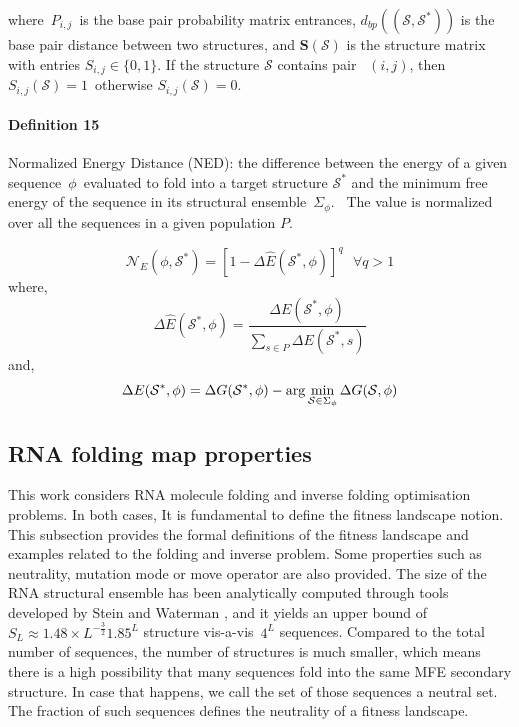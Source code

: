 where~\(P_{i,j}\)~is the base pair probability matrix entrances, $d_{bp} ((\mathcal{S},\mathcal{S}^*))$ is the base pair distance between two structures, and \(\mathbf{S}(\mathcal{S})\) is the structure matrix with entries \(S_{i,j} \in  \{ 0, 1\}\). If the structure \(\mathcal{S}\) contains pair~ $(i ,j)$, then \(S_{i,j}(\mathcal{S}) = 1\)~otherwise \(S_{i,j}(\mathcal{S}) = 0\).

\paragraph{\textbf{Definition 15} } Normalized Energy Distance (NED): the difference between
the energy of a given sequence~\(\phi\)~evaluated to fold into a target structure $\mathcal{S}^*$ and the minimum free energy of the sequence in its structural ensemble~\(\Sigma_{\phi}\).~ The value is normalized over all the sequences in a given population $P$.  


\begin{equation}
\label{ned}
\mathcal{N}_E (\phi, \mathcal{S}^*) = [1-\Delta \hat{E}(\mathcal{S}^*,\phi)]^q \text{   } \forall q>1
\end{equation}
where,
\begin{equation}
\Delta \hat{E}(\mathcal{S}^*, \phi) = \frac{\Delta E(\mathcal{S}^*, \phi) }{\sum_{s \in P}{\Delta E(\mathcal{S}^*, s)}}
\end{equation}
and,
\begin{equation}
\Delta E(\mathcal{S}^*,\phi) = \Delta G(\mathcal{S}^*, \phi) - \arg \min_{\mathcal{S} \in \Sigma_{\phi\\
}} \Delta G(\mathcal{S}, \phi)
\end{equation}


\subsection{RNA folding map properties}
This work considers RNA molecule folding and inverse folding optimisation problems. In both cases, It is fundamental to define the fitness landscape notion. This subsection provides the formal definitions of the fitness landscape and examples related to the folding and inverse problem. Some properties such as neutrality, mutation mode or move operator are also provided. The size of the RNA structural ensemble has been analytically computed through tools developed by Stein and Waterman \cite{stein1979some}, and it yields an upper bound of~\(S_L\approx1.48\times L^{-\frac{3}{2}}1.85^L\) structure vis-a-vis~\(4^L\) sequences. Compared to the total number of sequences, the number of structures is much smaller, which means there is a high possibility that many sequences fold into the same MFE secondary structure. In case that happens, we call the set of those sequences a neutral set. The fraction of such sequences defines the neutrality of a fitness landscape.

